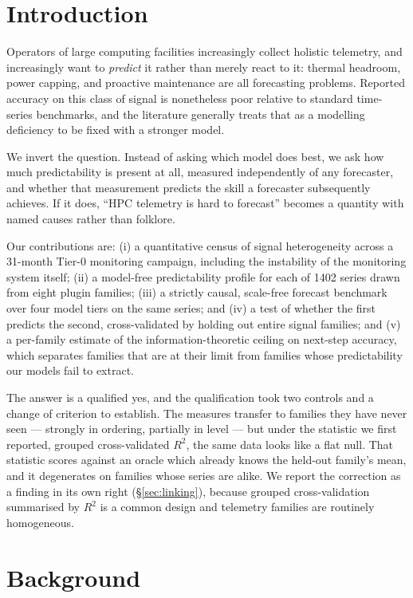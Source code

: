 \documentclass[11pt,a4paper]{article}
\newcommand{\num}[1]{#1}
\begin{document}
\section{Introduction}
\label{sec:intro}

Operators of large computing facilities increasingly collect holistic telemetry,
and increasingly want to \emph{predict} it rather than merely react to it:
thermal headroom, power capping, and proactive maintenance are all forecasting
problems. Reported accuracy on this class of signal is nonetheless poor relative
to standard time-series benchmarks, and the literature generally treats that as
a modelling deficiency to be fixed with a stronger model.

We invert the question. Instead of asking which model does best, we ask how much
predictability is present at all, measured independently of any forecaster, and
whether that measurement predicts the skill a forecaster subsequently achieves.
If it does, ``HPC telemetry is hard to forecast'' becomes a quantity with named
causes rather than folklore.

Our contributions are: (i) a quantitative census of signal heterogeneity across
a 31-month Tier-0 monitoring campaign, including the instability of the
monitoring system itself; (ii) a model-free predictability profile for each of
\num{1402} series drawn from eight plugin families; (iii) a strictly causal,
scale-free forecast benchmark over four model tiers on the same series; and
(iv) a test of whether the first predicts the second, cross-validated by holding
out entire signal families; and (v) a per-family estimate of the
information-theoretic ceiling on next-step accuracy, which separates families
that are at their limit from families whose predictability our models fail to
extract.

The answer is a qualified yes, and the qualification took two controls and a
change of criterion to establish. The measures transfer to families they have
never seen --- strongly in ordering, partially in level --- but under the
statistic we first reported, grouped cross-validated \(R^2\), the same data
looks like a flat null. That statistic scores against an oracle which already
knows the held-out family's mean, and it degenerates on families whose series
are alike. We report the correction as a finding in its own right
(\S\ref{sec:linking}), because grouped cross-validation summarised by \(R^2\) is
a common design and telemetry families are routinely homogeneous.

\section{Background}
\label{sec:background}
\end{document}
